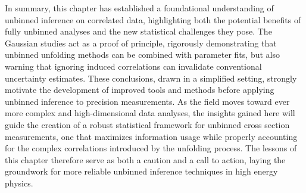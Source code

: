     In summary, this chapter has established a foundational understanding of unbinned inference on correlated data, highlighting both the potential benefits of fully unbinned analyses and the new statistical challenges they pose.
    The Gaussian studies act as a proof of principle, rigorously demonstrating that unbinned unfolding methods can be combined with parameter fits, but also warning that ignoring induced correlations can invalidate conventional uncertainty estimates.
    These conclusions, drawn in a simplified setting, strongly motivate the development of improved tools and methods before applying unbinned inference to precision measurements.
    As the field moves toward ever more complex and high-dimensional data analyses, the insights gained here will guide the creation of a robust statistical framework for unbinned cross section measurements, one that maximizes information usage while properly accounting for the complex correlations introduced by the unfolding process.
    The lessons of this chapter therefore serve as both a caution and a call to action, laying the groundwork for more reliable unbinned inference techniques in high energy physics.